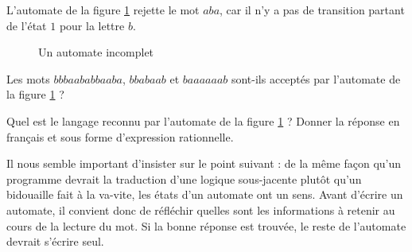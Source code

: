 \begin{example}
L'automate de la figure \ref{incompauto} rejette le mot $aba$, car il n'y a pas de transition partant de l'état $1$ pour la lettre $b$.
\end{example}


\begin{figure}[!h]
\centering
{}
\caption{Un automate incomplet}
\label{incompauto}
\end{figure}


\begin{exercice}
Les mots $bbbaababbaaba$, $bbabaab$ et $baaaaaab$ sont-ils acceptés par l'automate de la figure \ref{incompauto} ?
\end{exercice}

\begin{exercice}
Quel est le langage reconnu par l'automate de la figure \ref{incompauto} ? Donner la réponse en français et sous forme d'expression rationnelle.
\end{exercice}


Il nous semble important d'insister sur le point suivant : de la même façon qu'un programme devrait la traduction d'une logique sous-jacente plutôt qu'un bidouaille fait à la va-vite, les états d'un automate ont un sens. Avant d'écrire un automate, il convient donc de réfléchir quelles sont les informations à retenir au cours de la lecture du mot. Si la bonne réponse est trouvée, le reste de l'automate devrait s'écrire seul.

